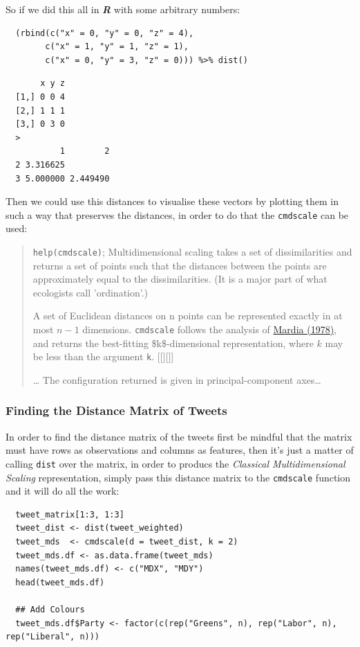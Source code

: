 \documentclass[11pt]{article}
\begin{document}
So if we did this all in \textbf{\emph{R}} with some arbitrary numbers:

\begin{verbatim}
  (rbind(c("x" = 0, "y" = 0, "z" = 4),
        c("x" = 1, "y" = 1, "z" = 1),
        c("x" = 0, "y" = 3, "z" = 0))) %>% dist()
\end{verbatim}

\begin{verbatim}
       x y z
  [1,] 0 0 4
  [2,] 1 1 1
  [3,] 0 3 0
  >
           1        2
  2 3.316625
  3 5.000000 2.449490
\end{verbatim}

Then we could use this distances to visualise these vectors by plotting
them in such a way that preserves the distances, in order to do that the
\texttt{cmdscale} can be used:

\begin{quote}
\texttt{help(cmdscale)}; Multidimensional scaling takes a set of
dissimilarities and returns a set of points such that the distances
between the points are approximately equal to the dissimilarities. (It
is a major part of what ecologists call 'ordination'.)

A set of Euclidean distances on n points can be represented exactly in
at most \(n - 1\) dimensions. \texttt{cmdscale} follows the analysis of
\href{https://www.tandfonline.com/doi/abs/10.1080/03610927808827707}{Mardia
(1978)}, and returns the best-fitting \$k\$-dimensional representation,
where \(k\) may be less than the argument \texttt{k}. [[][]]

\ldots{} The configuration returned is given in principal-component axes\ldots{}
\end{quote}

\subsubsection{Finding the Distance Matrix of Tweets}
\label{sec:orgefc6573}
In order to find the distance matrix of the tweets first be mindful that
the matrix must have rows as observations and columns as features, then
it's just a matter of calling \texttt{dist} over the matrix, in order to
producs the \emph{Classical Multidimensional Scaling} representation, simply
pass this distance matrix to the \texttt{cmdscale} function and it will do all
the work:

\begin{verbatim}
  tweet_matrix[1:3, 1:3]
  tweet_dist <- dist(tweet_weighted)
  tweet_mds  <- cmdscale(d = tweet_dist, k = 2)
  tweet_mds.df <- as.data.frame(tweet_mds)
  names(tweet_mds.df) <- c("MDX", "MDY")
  head(tweet_mds.df)

  ## Add Colours
  tweet_mds.df$Party <- factor(c(rep("Greens", n), rep("Labor", n), rep("Liberal", n)))
\end{verbatim}
\end{document}
